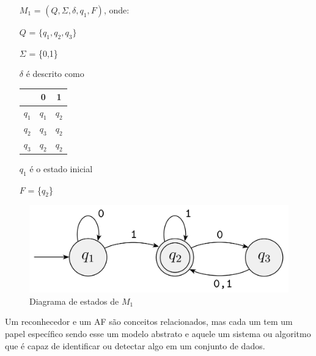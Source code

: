 \begin{itemize}
    \item[$M_1$] = $(Q, \Sigma, \delta, q_1, F)$, onde:
    \item[$Q$] = $\{q_1, q_2, q_3\}$
    \item[$\Sigma$] = \{0,1\}
    \item [$\delta$] é descrito como
    \item [ ]
        \begin{tabular}{c|cc}
            & 0 & 1 \\ \hline
            $q_1$ & $q_1$ & $q_2$ \\
            $q_2$ & $q_3$ & $q_2$ \\
            $q_3$ & $q_2$ & $q_2$ \\
        \end{tabular}
    \item[$q_1$] é o estado inicial
    \item[$F$] = \{$q_2$\}
\end{itemize}

\begin{figure}[!htb]
	\centering
	\includegraphics[scale=1]{figuras/AFD/m1.png}
	\caption{Diagrama de estados de $M_1$}
	\label{fig:Diagrama de estados}
\end{figure}

Um reconhecedor e um \ac{AF} são conceitos relacionados, mas cada um tem um papel específico sendo esse um modelo abstrato e aquele um sistema ou algoritmo que é capaz de identificar ou detectar algo em um conjunto de dados.





